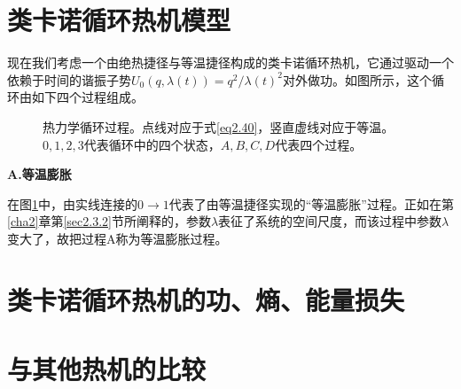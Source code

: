 \section{类卡诺循环热机模型}

\qquad 现在我们考虑一个由绝热捷径与等温捷径构成的类卡诺循环热机，它通过驱动一个依赖于时间的谐振子势$U_{0}(q, \lambda(t))= q^{2}/{\lambda(t)}^2 $对外做功。如图所示，这个循环由如下四个过程组成。

\begin{figure}[!htbp]
    \centering
    \def\svgwidth{0.6\columnwidth}
    
    \caption{热力学循环过程。点线对应于式\eqref{eq2.40}，竖直虚线对应于等温。$0,1,2,3$代表循环中的四个状态，$A,B,C,D$代表四个过程。}
    \label{p3.1}
\end{figure}


\begin{center}
    {\bfseries A.等温膨胀}
\end{center}

在图\ref{p3.1}中，由实线连接的$0 \to 1$代表了由等温捷径实现的“等温膨胀”过程。正如在第\ref{cha2}章第\ref{sec2.3.2}节所阐释的，参数$\lambda$表征了系统的空间尺度，而该过程中参数$\lambda$变大了，故把过程A称为等温膨胀过程。

\section{类卡诺循环热机的功、熵、能量损失}

\section{与其他热机的比较}